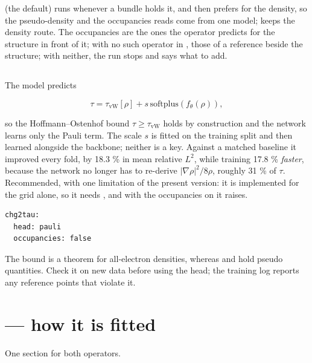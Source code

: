  (the default) runs  whenever a bundle holds it, and then prefers  for the density, so the pseudo-density and the occupancies  reads come from one model;  keeps the density route. The occupancies are the ones the  operator predicts for the structure in front of it; with no such operator in , those of a reference  beside the structure; with neither, the run stops and says what to add.

\subsection{}

\label{sec:pauli}

The model predicts

\[\tau = \tau_\mathrm{vW}[\rho] + s\,\mathrm{softplus}(f_\theta(\rho)),\]

so the Hoffmann--Ostenhof bound $\tau \ge \tau_\mathrm{vW}$ holds by construction and the network learns only the Pauli term. The scale $s$ is fitted on the training split and then learned alongside the backbone; neither is a key. Against a matched baseline it improved every fold, by 18.3 \% in mean relative $L^2$, while training 17.8 \% \emph{faster}, because the network no longer has to re-derive $|\nabla\rho|^2/8\rho$, roughly 31 \% of $\tau$. Recommended, with one limitation of the present version: it is implemented for the grid alone, so it needs , and with the occupancies on it raises.

\begin{lstlisting}
chg2tau:
  head: pauli
  occupancies: false
\end{lstlisting}

\begin{pwarn}
The bound is a theorem for all-electron densities, whereas  and  hold pseudo quantities. Check it on new data before using the head; the training log reports any reference points that violate it.
\end{pwarn}

\section{ --- how it is fitted}

One section for both operators.

